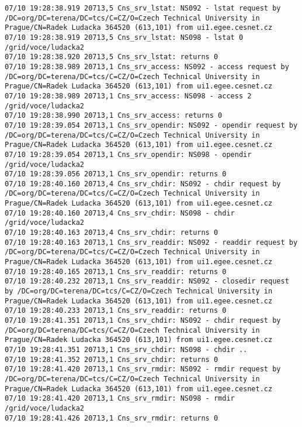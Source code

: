 \documentclass[a4paper, 11pt]{article} %
\begin{document}
\begin{lstlisting}[label={log:rm},caption={lfc-rm -r /grid/voce/ludacka2}]
07/10 19:28:38.919 20713,5 Cns_srv_lstat: NS092 - lstat request by /DC=org/DC=terena/DC=tcs/C=CZ/O=Czech Technical University in Prague/CN=Radek Ludacka 364520 (613,101) from ui1.egee.cesnet.cz
07/10 19:28:38.919 20713,5 Cns_srv_lstat: NS098 - lstat 0 /grid/voce/ludacka2
07/10 19:28:38.920 20713,5 Cns_srv_lstat: returns 0
07/10 19:28:38.989 20713,1 Cns_srv_access: NS092 - access request by /DC=org/DC=terena/DC=tcs/C=CZ/O=Czech Technical University in Prague/CN=Radek Ludacka 364520 (613,101) from ui1.egee.cesnet.cz
07/10 19:28:38.989 20713,1 Cns_srv_access: NS098 - access 2 /grid/voce/ludacka2
07/10 19:28:38.990 20713,1 Cns_srv_access: returns 0
07/10 19:28:39.054 20713,1 Cns_srv_opendir: NS092 - opendir request by /DC=org/DC=terena/DC=tcs/C=CZ/O=Czech Technical University in Prague/CN=Radek Ludacka 364520 (613,101) from ui1.egee.cesnet.cz
07/10 19:28:39.054 20713,1 Cns_srv_opendir: NS098 - opendir /grid/voce/ludacka2 
07/10 19:28:39.056 20713,1 Cns_srv_opendir: returns 0
07/10 19:28:40.160 20713,4 Cns_srv_chdir: NS092 - chdir request by /DC=org/DC=terena/DC=tcs/C=CZ/O=Czech Technical University in Prague/CN=Radek Ludacka 364520 (613,101) from ui1.egee.cesnet.cz
07/10 19:28:40.160 20713,4 Cns_srv_chdir: NS098 - chdir /grid/voce/ludacka2
07/10 19:28:40.163 20713,4 Cns_srv_chdir: returns 0
07/10 19:28:40.163 20713,1 Cns_srv_readdir: NS092 - readdir request by /DC=org/DC=terena/DC=tcs/C=CZ/O=Czech Technical University in Prague/CN=Radek Ludacka 364520 (613,101) from ui1.egee.cesnet.cz
07/10 19:28:40.165 20713,1 Cns_srv_readdir: returns 0
07/10 19:28:40.232 20713,1 Cns_srv_readdir: NS092 - closedir request by /DC=org/DC=terena/DC=tcs/C=CZ/O=Czech Technical University in Prague/CN=Radek Ludacka 364520 (613,101) from ui1.egee.cesnet.cz
07/10 19:28:40.233 20713,1 Cns_srv_readdir: returns 0
07/10 19:28:41.351 20713,1 Cns_srv_chdir: NS092 - chdir request by /DC=org/DC=terena/DC=tcs/C=CZ/O=Czech Technical University in Prague/CN=Radek Ludacka 364520 (613,101) from ui1.egee.cesnet.cz
07/10 19:28:41.351 20713,1 Cns_srv_chdir: NS098 - chdir ..
07/10 19:28:41.352 20713,1 Cns_srv_chdir: returns 0
07/10 19:28:41.420 20713,1 Cns_srv_rmdir: NS092 - rmdir request by /DC=org/DC=terena/DC=tcs/C=CZ/O=Czech Technical University in Prague/CN=Radek Ludacka 364520 (613,101) from ui1.egee.cesnet.cz
07/10 19:28:41.420 20713,1 Cns_srv_rmdir: NS098 - rmdir /grid/voce/ludacka2
07/10 19:28:41.426 20713,1 Cns_srv_rmdir: returns 0
\end{lstlisting}
\end{document}
